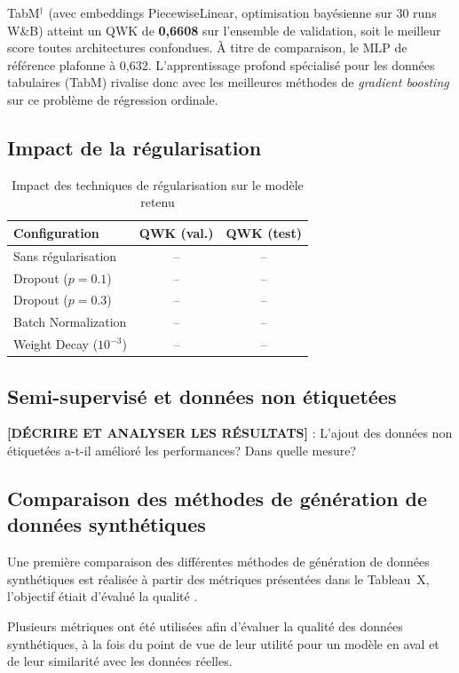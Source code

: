 \documentclass[conference]{IEEEtran}
\begin{document}
TabM$^\dagger$ (avec embeddings PiecewiseLinear, optimisation bayésienne sur 30 runs W\&B)
atteint un QWK de \textbf{0,6608} sur l'ensemble de validation, soit le meilleur score
toutes architectures confondues. À titre de comparaison, le MLP de référence plafonne à
0,632. L'apprentissage profond spécialisé pour les données tabulaires (TabM) rivalise donc
avec les meilleures méthodes de \textit{gradient boosting} sur ce problème de régression ordinale.

\subsection{Impact de la régularisation}

\begin{table}[htbp]
\caption{Impact des techniques de régularisation sur le modèle retenu}
\label{tab:regularisation}
\centering
\begin{tabular}{lcc}
\toprule
\textbf{Configuration} & \textbf{QWK (val.)} & \textbf{QWK (test)} \\
\midrule
Sans régularisation & -- & -- \\
Dropout ($p=0.1$)   & -- & -- \\
Dropout ($p=0.3$)   & -- & -- \\
Batch Normalization & -- & -- \\
Weight Decay ($10^{-3}$) & -- & -- \\
\bottomrule
\end{tabular}
\end{table}

\subsection{Semi-supervisé et données non étiquetées}

\textbf{[DÉCRIRE ET ANALYSER LES RÉSULTATS]} : L'ajout des données non étiquetées a-t-il
amélioré les performances? Dans quelle mesure?

\subsection{Comparaison des méthodes de génération de données synthétiques}

Une première comparaison des différentes méthodes de génération de données synthétiques est réalisée à partir des métriques présentées dans le Tableau~X, l'objectif étiait d'évalué la qualité .


Plusieurs métriques ont été utilisées afin d’évaluer la qualité des données synthétiques, à la fois du point de vue de leur utilité pour un modèle en aval et de leur similarité avec les données réelles.\\
\end{document}
